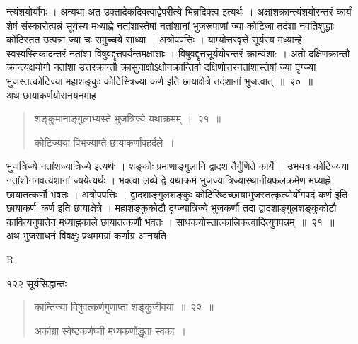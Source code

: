 \documentclass[11pt, openany]{book}
\begin{document}
\begin{sloppypar}
\noindent न्त्यंशयोर्योगः । अन्यथा अत उक्तादेकदिक्त्वाद्वैपरीत्ये भिन्नदिक्त्व इत्यर्थः । अक्षांशक्रान्त्यंशयोरन्तरं कार्यं शेषं संस्कारोत्पन्नं सूर्यस्य मध्याह्ने नतांशास्तेषां नतांशानां भुजरूपाणां ज्या कोटिजा तदंशा नवतिशुद्धाः कोटिस्तत उत्पन्ना ज्या चः समुच्चये साध्या । अत्रोपपत्तिः । याम्योत्तरवृत्ते सूर्यस्य मध्यान्हे स्वस्वस्तिकादन्तरं नतांशा विषुवद्दृत्तपर्यन्तमक्षांशाः । विषुवद्दृत्तसूर्ययोरन्तरं क्रान्यंशा: । अतो दक्षिणक्रान्तौ क्रान्त्यक्षयोगो नतांशा उत्तरक्रान्तौ क्रासुनाक्षोऽक्षोनक्रान्तिर्वा दक्षिणोत्तरनतांशास्तेषां ज्या दृग्ज्या भुजस्तत्कोटिज्या महाशङ्कुः कोटिस्त्रिज्या कर्ण इति छायाक्षेत्रे तदंशानां भुजत्वात्~॥~२०~॥\\
\noindent अथ छायाकर्णयोरानयनमाह\textendash
\end{sloppypar}
\begin{quote}

 {\ssi शङ्कुमानाङ्गुलाभ्यस्ते भुजत्रिज्ये यथाक्रमम्~॥~२१~॥

 कोटिज्यया विभज्याप्ते छायाकर्णावहर्दले~।}
 \end{quote}

\begin{sloppypar}
 भुजत्रिज्ये नतांशज्यात्रिज्ये इत्यर्थः । शङ्कोः प्रमाणाङ्गुलानि द्वादश तैर्गुणिते कार्ये । उभयत्र कोटिज्यया नतांशोननवत्यंशानां ज्ययेत्यर्थः । भक्त्वा लब्धे द्वे यथाक्रमं भुजज्यात्रिज्यास्थानीयफलक्रमेण मध्याह्ने छायातत्कर्णौ भवतः । अत्रोपपत्तिः । द्वादशाङ्गुलशङ्कुः कोटिरिष्टच्छायाभुजस्तत्कृत्योर्योगपदं कर्ण इति छायाकर्णः कर्ण इति छायाक्षेत्रे । महाशङ्कुकोटौ दृग्ज्यात्रिज्ये भुजकर्णौ तदा द्वादशाङ्गुलशङ्कुकोटौ कावित्यनुपातेन मध्याह्नकाले छायातत्कर्णौ भवतः । साधकयोस्तात्कालिकत्वादित्युपपन्नम्~॥~२१~॥\\
 \noindent अथ भुजसाधनं विवक्षुः प्रथममग्रां कर्णाग्र आनयति\textendash
\end{sloppypar}

 {\tiny{R}}

\newpage


\noindent १२२ \hspace{4cm} सूर्यसिद्धान्तः 
\vspace{1cm}


\begin{quote}
 {\ssi कान्तिज्या विषुवत्कर्णगुणाप्ता शङ्कुजीवया~॥~२२~॥
 
 अर्काग्रा स्वेष्टकर्णघ्नी मध्यकर्णोद्धृता स्वका~।}
 \end{quote}
\end{document}
